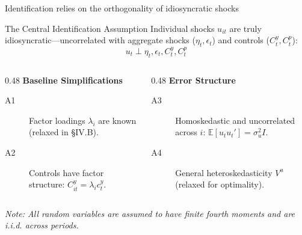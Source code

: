 \begin{frame}{Identification relies on the orthogonality of idiosyncratic shocks}
    \vspace{-0.5em}
    \begin{block}{The Central Identification Assumption}
        Individual shocks $u_{it}$ are truly idiosyncratic—uncorrelated with aggregate shocks ($\eta_t, \epsilon_t$) and controls ($C_t^y, C_t^p$):
        \begin{equation}
            u_t \perp \eta_t, \epsilon_t, C_t^y, C_t^p
        \end{equation}
    \end{block}

    \vfill

    \begin{columns}[T]
        \begin{column}{0.48\textwidth}
            \textbf{Baseline Simplifications}
            \begin{description}
                \item[A1] Factor loadings $\lambda_i$ are known (relaxed in §IV.B).
                \item[A2] Controls have factor structure: $C_{it}^y = \lambda_i c_t^y$.
            \end{description}
        \end{column}
        \begin{column}{0.48\textwidth}
            \textbf{Error Structure}
            \begin{description}
                \item[A3] Homoskedastic and uncorrelated across $i$: $\mathbb{E}[u_t u_t'] = \sigma_u^2 I$.
                \item[A4] General heteroskedasticity $V^u$ (relaxed for optimality).
            \end{description}
        \end{column}
    \end{columns}

    \vfill
    \footnotesize
    \textit{Note: All random variables are assumed to have finite fourth moments and are i.i.d. across periods.}
\end{frame}
